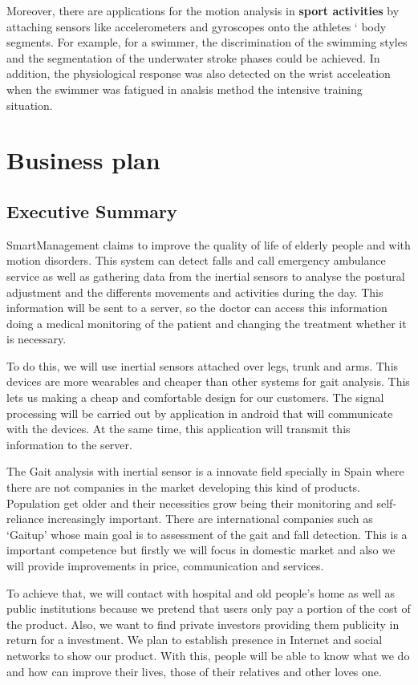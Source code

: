 Moreover, there are applications for the motion analysis in \textbf{sport activities} by attaching sensors like accelerometers and gyroscopes onto the athletes ‘  body segments. For example, for a swimmer, the discrimination of the swimming styles and the segmentation of the underwater stroke phases could be achieved. In addition, the physiological response was also detected on the wrist acceleation when the swimmer was fatigued in analsis method the intensive training situation\cite{Yuji}.



\section{Business plan }
\subsection{Executive Summary}
SmartManagement claims to improve  the quality of life of elderly  people and with motion disorders. This system can detect falls and call emergency ambulance service as well as gathering data from the inertial sensors to analyse the postural adjustment and the differents movements and activities during the day. This information will be sent to a server, so the doctor can access this information  doing a medical monitoring of the patient and changing the treatment whether it is necessary.

To do this, we will use inertial sensors attached over legs, trunk and arms. This devices are more wearables and cheaper than other systems for gait analysis. This lets us making a cheap and comfortable design for our customers. The signal processing will be carried out by application in android that will communicate with the devices. At the same time, this application will transmit this information to the server.

The Gait analysis with inertial sensor is a innovate field specially in Spain where there are not companies in the market developing this kind of products. Population get older and their necessities grow being their monitoring and self-reliance increasingly important.
There are international companies such as ‘Gaitup’ whose main goal is to assessment of the gait  and fall detection. This is a important competence but firstly we will focus in domestic market and also we will provide improvements in price, communication and services.

To achieve that, we will contact with hospital and old people’s home as well as public institutions because we pretend that users only pay a portion of the cost of the product. Also, we want to find private investors providing them publicity in return for a investment.
We plan to establish presence in Internet and social networks to show our product. With this, people will be able to know what we do and how can improve their lives, those of their relatives and other loves one.


